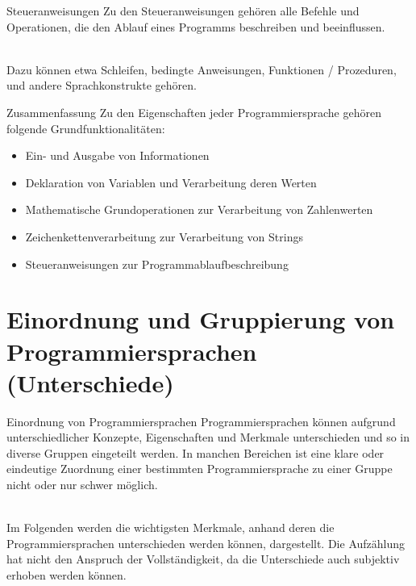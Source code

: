     \begin{frame}{Steueranweisungen}
        Zu den Steueranweisungen gehören alle Befehle und Operationen, die den Ablauf eines Programms beschreiben und beeinflussen. \\~\
        
        Dazu können etwa Schleifen, bedingte Anweisungen, Funktionen / Prozeduren, und andere Sprachkonstrukte gehören.
        
    \end{frame}
    
    \begin{frame}{Zusammenfassung}
        Zu den Eigenschaften jeder Programmiersprache gehören folgende Grundfunktionalitäten:
        
        \begin{itemize}
            \item Ein- und Ausgabe von Informationen
            \item Deklaration von Variablen und Verarbeitung deren Werten
            \item Mathematische Grundoperationen zur Verarbeitung von Zahlenwerten
            \item Zeichenkettenverarbeitung zur Verarbeitung von Strings
            \item Steueranweisungen zur Programmablaufbeschreibung
        \end{itemize}
    \end{frame}
        
\section{Einordnung und Gruppierung von Programmiersprachen (Unterschiede)}
    
    \begin{frame}{Einordnung von Programmiersprachen}
        Programmiersprachen können aufgrund unterschiedlicher Konzepte, Eigenschaften und Merkmale unterschieden und so in diverse Gruppen eingeteilt werden. In manchen Bereichen ist eine klare oder eindeutige Zuordnung einer bestimmten Programmiersprache zu einer Gruppe nicht oder nur schwer möglich. \\~\
        
        Im Folgenden werden die wichtigsten Merkmale, anhand deren die Programmiersprachen unterschieden werden können, dargestellt. Die Aufzählung hat nicht den Anspruch der Vollständigkeit, da die Unterschiede auch subjektiv erhoben werden können.
        
    \end{frame}
    
